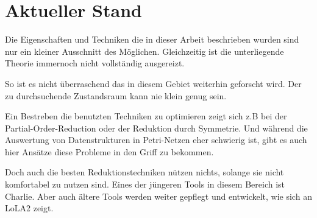 \chapter{Aktueller Stand}

Die Eigenschaften und Techniken die in dieser Arbeit beschrieben wurden sind nur ein kleiner Ausschnitt des Möglichen. 
Gleichzeitig ist die unterliegende Theorie immernoch nicht vollständig ausgereizt.

So ist es nicht überraschend das in diesem Gebiet weiterhin geforscht wird. 
Der zu durchsuchende Zustandsraum kann nie klein genug sein.

Ein Bestreben die benutzten Techniken zu optimieren zeigt sich z.B bei der Partial-Order-Reduction\cite{bonneland2018start} oder der Reduktion durch Symmetrie\cite{bourdil2016symmetry}.
Und während die Auswertung von Datenstrukturen in Petri-Netzen eher schwierig ist, gibt es auch hier Ansätze diese Probleme in den Griff zu bekommen\cite{xiang2017detecting}.

Doch auch die besten Reduktionstechniken nützen nichts, solange sie nicht komfortabel zu nutzen sind.
Eines der jüngeren Tools in diesem Bereich ist Charlie\cite{heiner2015charlie}. Aber auch ältere Tools werden weiter gepflegt und entwickelt, wie sich an LoLA2 zeigt\cite{wolf2018petri}.
